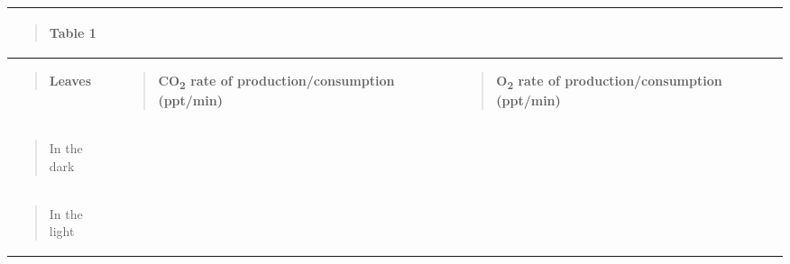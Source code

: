 \documentclass[
  letterpaper,
  DIV=11,
  numbers=noendperiod]{scrreprt}
\newcounter{none} %
\begin{document}
{\def\LTcaptype{none} %
\begin{longtable}[]{@{}
  >{\raggedright\arraybackslash}p{}
  >{\raggedright\arraybackslash}p{}
  >{\raggedright\arraybackslash}p{}@{}}
\toprule\noalign{}
\begin{minipage}[b]{\linewidth}\raggedright
\begin{quote}
Table 1
\end{quote}
\end{minipage} & \begin{minipage}[b]{\linewidth}\raggedright
\end{minipage} & \begin{minipage}[b]{\linewidth}\raggedright
\end{minipage} \\
\midrule\noalign{}
\endhead
\bottomrule\noalign{}
\endlastfoot
\begin{minipage}[t]{\linewidth}\raggedright
\begin{quote}
\textbf{Leaves}
\end{quote}
\end{minipage} & \begin{minipage}[t]{\linewidth}\raggedright
\begin{quote}
\textbf{CO\textsubscript{2} rate of production/consumption (ppt/min)}
\end{quote}
\end{minipage} & \begin{minipage}[t]{\linewidth}\raggedright
\begin{quote}
\textbf{O\textsubscript{2} rate of production/consumption (ppt/min)}
\end{quote}
\end{minipage} \\
\begin{minipage}[t]{\linewidth}\raggedright
\begin{quote}
In the dark
\end{quote}
\end{minipage} & & \\
\begin{minipage}[t]{\linewidth}\raggedright
\begin{quote}
In the light
\end{quote}
\end{minipage} & & \\
\end{longtable}
}
\end{document}
